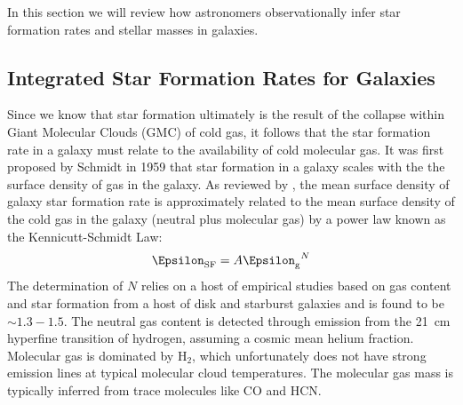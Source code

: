 In this section we will review how astronomers observationally infer star formation rates and stellar masses in galaxies. 

\subsection{Integrated Star Formation Rates for Galaxies}
\label{sfrs}

Since we know that star formation ultimately is the result of the collapse within Giant Molecular Clouds (GMC) of cold gas, it follows that the star formation rate in a galaxy must relate to the availability of cold molecular gas. It was first proposed by Schmidt in 1959 \citep{1959ApJ...129..243S} that star formation in a galaxy scales with the the surface density of gas in the galaxy. As reviewed by \citet{1998ApJ...498..541K}, the mean surface density of galaxy star formation 
rate is approximately related to the mean surface density of the 
cold gas in the galaxy (neutral plus molecular gas) by a power law
known as the Kennicutt-Schmidt Law:\\
$$\Epsilon_{\rm SF}  = A{\Epsilon_{\rm g}}^N$$
The determination of $N$ relies on a host of empirical studies based on gas content and star formation from a host of disk and starburst galaxies and is found to be $\sim 1.3-1.5$.
The neutral gas content is detected through emission from the
21~cm hyperfine transition of hydrogen, assuming a cosmic mean 
helium fraction.
Molecular gas is dominated by H$_2$, which unfortunately does not 
have strong emission lines at typical molecular cloud temperatures.
The molecular gas mass is typically inferred from trace molecules
like CO and HCN. 

